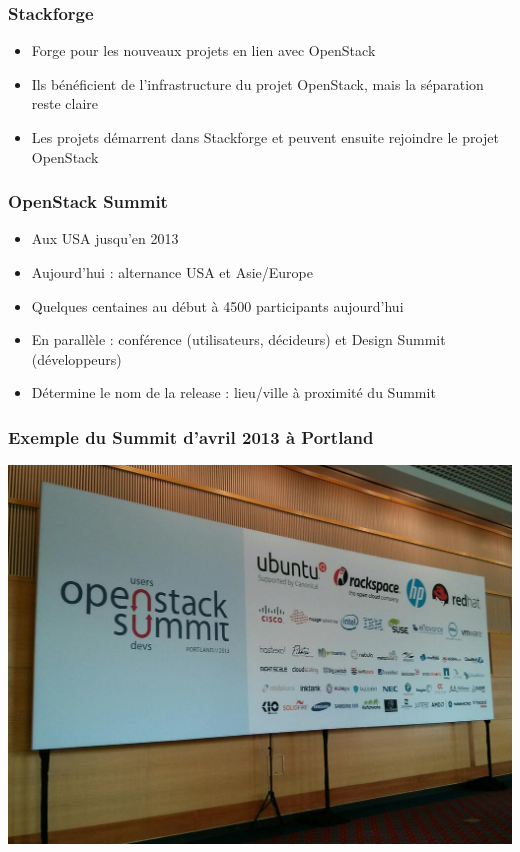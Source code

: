   \begin{frame}
    \frametitle{Stackforge}
    \begin{itemize}
      \item Forge pour les nouveaux projets en lien avec OpenStack
      \item Ils bénéficient de l'infrastructure du projet OpenStack, mais la séparation reste claire
      \item Les projets démarrent dans Stackforge et peuvent ensuite rejoindre le projet OpenStack
    \end{itemize}
  \end{frame}

  \begin{frame}
    \frametitle{OpenStack Summit}
    \begin{itemize}
      \item Aux USA jusqu'en 2013
      \item Aujourd'hui : alternance USA et Asie/Europe
      \item Quelques centaines au début à 4500 participants aujourd'hui
      \item En parallèle : conférence (utilisateurs, décideurs) et Design Summit (développeurs)
      \item Détermine le nom de la release : lieu/ville à proximité du Summit
    \end{itemize}
  \end{frame}

  \begin{frame}
    \frametitle{Exemple du Summit d'avril 2013 à Portland}
    \includegraphics[width=\textwidth]{images/photo-summit.jpg}
  \end{frame}

